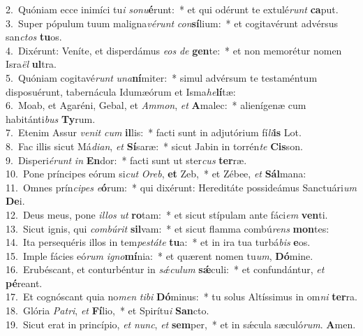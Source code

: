 {2.~}Quóniam ecce inimíci tu\textit{i} \textit{so}\textit{nu}\textbf{é}runt:~* et qui odérunt te extulé\textit{runt} \textbf{ca}put.\\
{3.~}Super pópulum tuum maligna\textit{vé}\textit{runt} \textit{con}\textbf{sí}lium:~* et cogitavérunt advérsus san\textit{ctos} \textbf{tu}os.\\
{4.~}Dixérunt: Veníte, et disperdámus \textit{e}\textit{os} \textit{de} \textbf{gen}te:~* et non memorétur nomen Isra\textit{ël} \textbf{ul}tra.\\
{5.~}Quóniam cogitavé\textit{runt} \textit{u}\textit{na}\textbf{ní}miter:~* simul advérsum te testaméntum disposuérunt, tabernácula Idumæórum et Isma\textit{he}\textbf{lí}tæ:\\
{6.~}Moab, et Agaréni, Gebal, et \textit{Am}\textit{mon}, \textit{et} \textbf{A}malec:~* alienígenæ cum habitánti\textit{bus} \textbf{Ty}rum.\\
{7.~}Etenim Assur \textit{ve}\textit{nit} \textit{cum} \textbf{il}lis:~* facti sunt in adjutórium fí\textit{li}\textbf{is} Lot.\\
{8.~}Fac illis sicut Má\textit{di}\textit{an}, \textit{et} \textbf{Sí}saræ:~* sicut Jabin in torrén\textit{te} \textbf{Cis}son.\\
{9.~}Disperi\textit{é}\textit{runt} \textit{in} \textbf{En}dor:~* facti sunt ut ster\textit{cus} \textbf{ter}ræ.\\
{10.~}Pone príncipes eórum si\textit{cut} \textit{O}\textit{reb}, \textbf{et} Zeb,~* et Zébee, \textit{et} \textbf{Sál}mana:\\
{11.~}Omnes prín\textit{ci}\textit{pes} \textit{e}\textbf{ó}rum:~* qui dixérunt: Hereditáte possideámus Sanctuári\textit{um} \textbf{De}i.\\
{12.~}Deus meus, pone \textit{il}\textit{los} \textit{ut} \textbf{ro}tam:~* et sicut stípulam ante fáci\textit{em} \textbf{ven}ti.\\
{13.~}Sicut ignis, qui \textit{com}\textit{bú}\textit{rit} \textbf{sil}vam:~* et sicut flamma combú\textit{rens} \textbf{mon}tes:\\
{14.~}Ita persequéris illos in tem\textit{pe}\textit{stá}\textit{te} \textbf{tu}a:~* et in ira tua turbá\textit{bis} \textbf{e}os.\\
{15.~}Imple fácies eó\textit{rum} \textit{i}\textit{gno}\textbf{mí}nia:~* et quærent nomen tu\textit{um}, \textbf{Dó}mine.\\
{16.~}Erubéscant, et conturbéntur in \textit{sǽ}\textit{cu}\textit{lum} \textbf{sǽ}culi:~* et confundántur, \textit{et} \textbf{pé}reant.\\
{17.~}Et cognóscant quia no\textit{men} \textit{ti}\textit{bi} \textbf{Dó}minus:~* tu solus Altíssimus in om\textit{ni} \textbf{ter}ra.\\
{18.~}Glória \textit{Pa}\textit{tri}, \textit{et} \textbf{Fí}lio,~* et Spirítu\textit{i} \textbf{San}cto.\\
{19.~}Sicut erat in princípio, \textit{et} \textit{nunc}, \textit{et} \textbf{sem}per,~* et in sǽcula sæculó\textit{rum}. \textbf{A}men.\\
